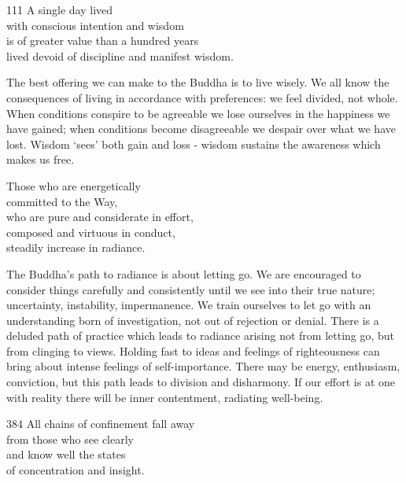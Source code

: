 \begin{dhpVerse}{111}
\label{dhp-111}
A single day lived\\
with conscious intention and wisdom\\
is of greater value than a hundred years\\
lived devoid of discipline and manifest wisdom.
\end{dhpVerse}

\begin{dhpRefl}
The best offering we can make to the Buddha is to live wisely. We all know the consequences of living in accordance with preferences: we feel divided, not whole. When conditions conspire to be agreeable we lose ourselves in the happiness we have gained; when conditions become disagreeable we despair over what we have lost. Wisdom `sees' both gain and loss - wisdom sustains the awareness which makes us free.
\end{dhpRefl}


\begin{dhpVerse}{24}
\label{dhp-24}
Those who are energetically\\
committed to the Way,\\
who are pure and considerate in effort,\\
composed and virtuous in conduct,\\
steadily increase in radiance.
\end{dhpVerse}

\begin{dhpRefl}
The Buddha's path to radiance is about letting go. We are encouraged to consider things carefully and consistently until we see into their true nature; uncertainty, instability, impermanence. We train ourselves to let go with an understanding born of investigation, not out of rejection or denial. There is a deluded path of practice which leads to radiance arising not from letting go, but from clinging to views. Holding fast to ideas and feelings of righteousness can bring about intense feelings of self-importance. There may be energy, enthusiasm, conviction, but this path leads to division and disharmony. If our effort is at one with reality there will be inner contentment, radiating well-being.
\end{dhpRefl}


\begin{dhpVerse}{384}
\label{dhp-384}
All chains of confinement fall away\\
from those who see clearly\\
and know well the states\\
of concentration and insight.
\end{dhpVerse}


